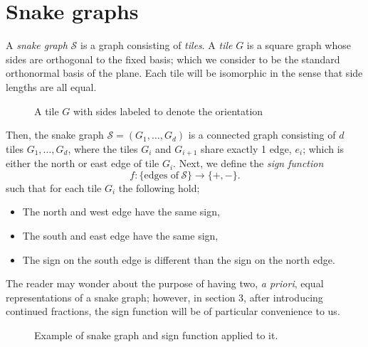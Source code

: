 \section{Snake graphs}
A \emph{snake graph} $\mathcal{S}$ is a graph consisting of \emph{tiles}. A \emph{tile} $G$ is a square graph whose sides are orthogonal to the fixed basis; which we consider to be the standard orthonormal basis of the plane. Each tile will be isomorphic in the sense that side lengths are all equal. 

\begin{figure}[H]
    \centering
{}    
\caption{A tile $G$ with sides labeled to denote the orientation}
\end{figure}

Then, the snake graph $\mathcal{S} = (G_1,\dots,G_d)$ is a connected graph consisting of $d$ tiles $G_1,\dots,G_d$, where the tiles $G_i$ and $G_{i+1}$ share exactly 1 edge, $e_i$; which is either the north or east edge of tile $G_i$.
Next, we define the \emph{sign function}
\begin{equation*}
    f: \{\text{edges of} \  \mathcal{S}\} \to \{+,-\}.
\end{equation*}
such that for each tile $G_i$ the following hold;
\begin{itemize}
    \item The north and west edge have the same sign,
    \item The south and east edge have the same sign,
    \item The sign on the south edge is different than the sign on the north edge.
\end{itemize}
The reader may wonder about the purpose of having two, \emph{a priori}, equal representations of a snake graph; however, in section 3, after introducing continued fractions, the sign function will be of particular convenience to us.
\begin{figure}[H]
    \centering
    
    \caption{Example of snake graph and sign function applied to it.}
\end{figure}

